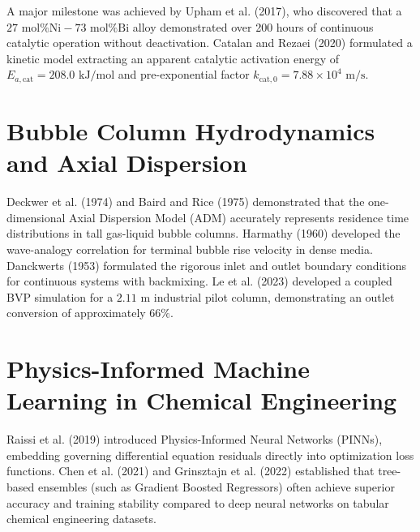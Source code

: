 \documentclass[12pt,a4paper,oneside]{report}
\begin{document}
A major milestone was achieved by Upham et al. (2017), who discovered that a $27\text{ mol\% Ni}-73\text{ mol\% Bi}$ alloy demonstrated over 200 hours of continuous catalytic operation without deactivation. Catalan and Rezaei (2020) formulated a kinetic model extracting an apparent catalytic activation energy of $E_{a,\text{cat}} = 208.0\text{ kJ/mol}$ and pre-exponential factor $k_{\text{cat},0} = 7.88 \times 10^4\text{ m/s}$.

\section{Bubble Column Hydrodynamics and Axial Dispersion}
Deckwer et al. (1974) and Baird and Rice (1975) demonstrated that the one-dimensional Axial Dispersion Model (ADM) accurately represents residence time distributions in tall gas-liquid bubble columns. Harmathy (1960) developed the wave-analogy correlation for terminal bubble rise velocity in dense media. Danckwerts (1953) formulated the rigorous inlet and outlet boundary conditions for continuous systems with backmixing. Le et al. (2023) developed a coupled BVP simulation for a $2.11\text{ m}$ industrial pilot column, demonstrating an outlet conversion of approximately $66\%$.

\section{Physics-Informed Machine Learning in Chemical Engineering}
Raissi et al. (2019) introduced Physics-Informed Neural Networks (PINNs), embedding governing differential equation residuals directly into optimization loss functions. Chen et al. (2021) and Grinsztajn et al. (2022) established that tree-based ensembles (such as Gradient Boosted Regressors) often achieve superior accuracy and training stability compared to deep neural networks on tabular chemical engineering datasets.
\end{document}

